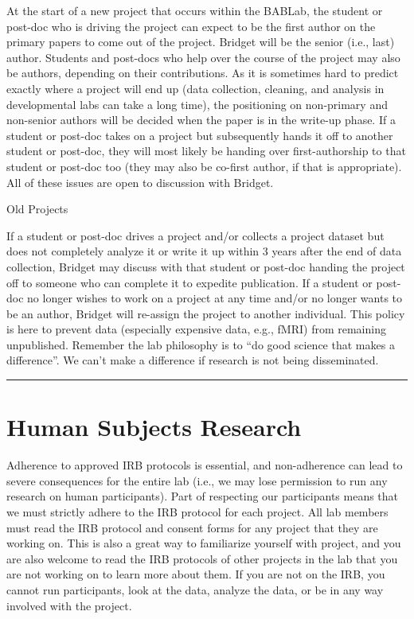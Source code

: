 \documentclass[]{book}
\begin{document}
At the start of a new project that occurs within the BABLab, the student or post-doc who is driving the project can expect to be the first author on the primary papers to come out of the project. Bridget will be the senior (i.e., last) author. Students and post-docs who help over the course of the project may also be authors, depending on their contributions. As it is sometimes hard to predict exactly where a project will end up (data collection, cleaning, and analysis in developmental labs can take a long time), the positioning on non-primary and non-senior authors will be decided when the paper is in the write-up phase. If a student or post-doc takes on a project but subsequently hands it off to another student or post-doc, they will most likely be handing over first-authorship to that student or post-doc too (they may also be co-first author, if that is appropriate). All of these issues are open to discussion with Bridget.

Old Projects

If a student or post-doc drives a project and/or collects a project dataset but does not completely analyze it or write it up within 3 years after the end of data collection, Bridget may discuss with that student or post-doc handing the project off to someone who can complete it to expedite publication. If a student or post-doc no longer wishes to work on a project at any time and/or no longer wants to be an author, Bridget will re-assign the project to another individual. This policy is here to prevent data (especially expensive data, e.g., fMRI) from remaining unpublished. Remember the lab philosophy is to ``do good science that makes a difference''. We can't make a difference if research is not being disseminated.

\begin{center}\rule{0.5\linewidth}{\linethickness}\end{center}

\hypertarget{human-subjects-research}{%
\section{Human Subjects Research}\label{human-subjects-research}}

Adherence to approved IRB protocols is essential, and non-adherence can lead to severe consequences for the entire lab (i.e., we may lose permission to run any research on human participants). Part of respecting our participants means that we must strictly adhere to the IRB protocol for each project. All lab members must read the IRB protocol and consent forms for any project that they are working on. This is also a great way to familiarize yourself with project, and you are also welcome to read the IRB protocols of other projects in the lab that you are not working on to learn more about them. If you are not on the IRB, you cannot run participants, look at the data, analyze the data, or be in any way involved with the project.
\end{document}
